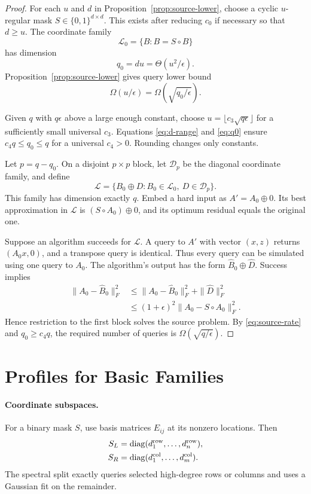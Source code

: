 \documentclass[twoside]{article}
\newcommand{\cL}{\mathcal L}
\begin{document}
\begin{proof}
For each $u$ and $d$ in Proposition~\ref{prop:source-lower}, choose a cyclic
$u$-regular mask $S\in\{0,1\}^{d\times d}$. This exists after reducing
$c_0$ if necessary so that $d\ge u$. The coordinate family
\[
 \cL_0=\{B:B=S\circ B\}
\]
has dimension
\begin{equation}
 q_0=du=\Theta(u^2/\epsilon).
 \label{eq:q0}
\end{equation}
Proposition~\ref{prop:source-lower} gives query lower bound
\begin{equation}
 \Omega(u/\epsilon)=\Omega(\sqrt{q_0/\epsilon}).
 \label{eq:source-rate}
\end{equation}

Given $q$ with $q\epsilon$ above a large enough constant, choose
$u=\lfloor c_3\sqrt{q\epsilon}\rfloor$ for a sufficiently small universal
$c_3$. Equations \eqref{eq:d-range} and \eqref{eq:q0} ensure
$c_4q\le q_0\le q$ for a universal $c_4>0$. Rounding changes only constants.

Let $p=q-q_0$. On a disjoint $p\times p$ block, let $\mathcal D_p$ be the
diagonal coordinate family, and define
\[
 \cL=\{B_0\oplus D:B_0\in\cL_0,\ D\in\mathcal D_p\}.
\]
This family has dimension exactly $q$. Embed a hard input as
$A'=A_0\oplus0$. Its best approximation in $\cL$ is
$(S\circ A_0)\oplus0$, and its optimum residual equals the original one.

Suppose an algorithm succeeds for $\cL$. A query to $A'$ with vector
$(x,z)$ returns $(A_0x,0)$, and a transpose query is identical. Thus every
query can be simulated using one query to $A_0$. The algorithm's output has
the form $\widehat B_0\oplus\widehat D$. Success implies
\begin{align*}
 \|A_0-\widehat B_0\|_F^2
 &\le\|A_0-\widehat B_0\|_F^2+\|\widehat D\|_F^2\\
 &\le(1+\epsilon)^2
 \|A_0-S\circ A_0\|_F^2.
\end{align*}
Hence restriction to the first block solves the source problem. By
\eqref{eq:source-rate} and $q_0\ge c_4q$, the required number of queries is
$\Omega(\sqrt{q/\epsilon})$.
\end{proof}

\section{Profiles for Basic Families}
\label{app:examples}

\paragraph{Coordinate subspaces.}
For a binary mask $S$, use basis matrices $E_{ij}$ at its nonzero locations.
Then
\begin{align*}
 S_L&=\operatorname{diag}(d_1^{\rm row},\ldots,d_n^{\rm row}),\\
 S_R&=\operatorname{diag}(d_1^{\rm col},\ldots,d_m^{\rm col}).
\end{align*}
The spectral split exactly queries selected high-degree rows or columns and
uses a Gaussian fit on the remainder.
\end{document}
